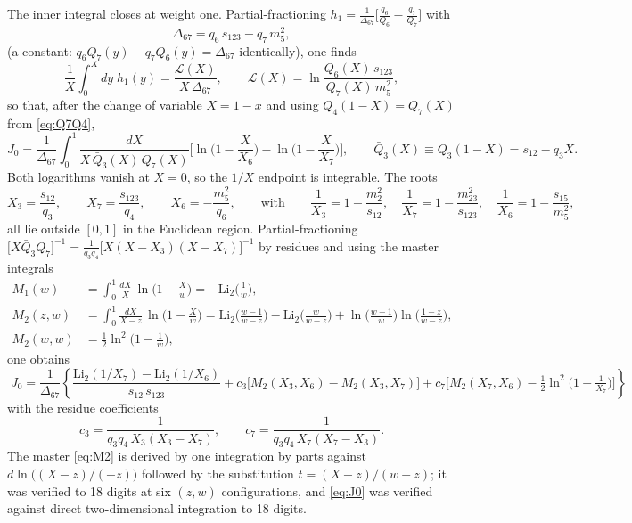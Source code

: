 \documentclass[11pt]{article}
\newcommand{\Li}{\mathrm{Li}}
\begin{document}
The inner integral closes at weight one. Partial-fractioning
$h_1=\tfrac{1}{\Delta_{67}}\big[\tfrac{q_6}{Q_6}-\tfrac{q_7}{Q_7}\big]$ with
\begin{equation}
\Delta_{67}=q_6\,s_{123}-q_7\,m_5^2 ,
\label{eq:D67}
\end{equation}
(a constant: $q_6Q_7(y)-q_7Q_6(y)=\Delta_{67}$ identically), one finds
\begin{equation}
\frac{1}{X}\int_0^{X}dy\;h_1(y)
=\frac{\mathcal{L}(X)}{X\,\Delta_{67}},
\qquad
\mathcal{L}(X)=\ln\frac{Q_6(X)\,s_{123}}{Q_7(X)\,m_5^2} ,
\label{eq:Lambda}
\end{equation}
so that, after the change of variable $X=1-x$ and using $Q_4(1-X)=Q_7(X)$ from \eqref{eq:Q7Q4},
\begin{equation}
J_0=\frac{1}{\Delta_{67}}\int_0^1\frac{dX}{X\,\bar Q_3(X)\,Q_7(X)}
\Big[\ln\Big(1-\frac{X}{X_6}\Big)-\ln\Big(1-\frac{X}{X_7}\Big)\Big],
\qquad
\bar Q_3(X)\equiv Q_3(1-X)=s_{12}-q_3X .
\end{equation}
Both logarithms vanish at $X=0$, so the $1/X$ endpoint is integrable. The roots
\begin{equation}
X_3=\frac{s_{12}}{q_3},\qquad
X_7=\frac{s_{123}}{q_4},\qquad
X_6=-\frac{m_5^2}{q_6},
\qquad\text{with}\qquad
\frac{1}{X_3}=1-\frac{m_2^2}{s_{12}},\quad
\frac{1}{X_7}=1-\frac{m_{23}^2}{s_{123}},\quad
\frac{1}{X_6}=1-\frac{s_{15}}{m_5^2},
\label{eq:roots}
\end{equation}
all lie outside $[0,1]$ in the Euclidean region. Partial-fractioning
$\big[X\bar Q_3Q_7\big]^{-1}=\tfrac{1}{q_3q_4}\big[X(X-X_3)(X-X_7)\big]^{-1}$ by residues and
using the master integrals
\begin{align}
M_1(w)&=\int_0^1\frac{dX}{X}\,\ln\Big(1-\frac Xw\Big)=-\Li_2\Big(\frac1w\Big),\\
M_2(z,w)&=\int_0^1\frac{dX}{X-z}\,\ln\Big(1-\frac Xw\Big)
=\Li_2\Big(\frac{w-1}{w-z}\Big)-\Li_2\Big(\frac{w}{w-z}\Big)
+\ln\Big(\frac{w-1}{w}\Big)\ln\Big(\frac{1-z}{w-z}\Big),
\label{eq:M2}\\
M_2(w,w)&=\tfrac12\ln^2\Big(1-\frac1w\Big),
\end{align}
one obtains
\begin{equation}
\boxed{\;
J_0=\frac{1}{\Delta_{67}}\left\{
\frac{\Li_2(1/X_7)-\Li_2(1/X_6)}{s_{12}\,s_{123}}
+c_3\Big[M_2(X_3,X_6)-M_2(X_3,X_7)\Big]
+c_7\Big[M_2(X_7,X_6)-\tfrac12\ln^2\big(1-\tfrac1{X_7}\big)\Big]
\right\}\;}
\label{eq:J0}
\end{equation}
with the residue coefficients
\begin{equation}
c_3=\frac{1}{q_3q_4\,X_3(X_3-X_7)},
\qquad
c_7=\frac{1}{q_3q_4\,X_7(X_7-X_3)} .
\end{equation}
The master \eqref{eq:M2} is derived by one integration by parts against
$d\ln\!\big((X-z)/(-z)\big)$ followed by the substitution $t=(X-z)/(w-z)$; it was verified to 18
digits at six $(z,w)$ configurations, and \eqref{eq:J0} was verified against direct
two-dimensional integration to 18 digits.
\end{document}
